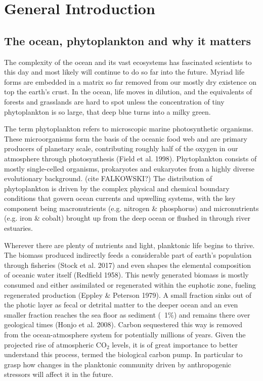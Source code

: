 \chapter{General Introduction}

\section{The ocean, phytoplankton and why it matters}
The complexity of the ocean and its vast ecosystems has fascinated scientists to this day and most likely will continue to do so far into the future. Myriad life forms are embedded in a matrix so far removed from our mostly dry existence on top the earth’s crust. In the ocean, life moves in dilution, and the equivalents of forests and grasslands are hard to spot unless the concentration of tiny phytoplankton is so large, that deep blue turns into a milky green.

The term phytoplankton refers to microscopic marine photosynthetic organisms. These microorganisms form the basis of the oceanic food web and are primary producers of planetary scale, contributing roughly half of the oxygen in our atmosphere through photosynthesis (Field et al. 1998). Phytoplankton consists of mostly single-celled organisms, prokaryotes and eukaryotes from a highly diverse evolutionary background. (cite FALKOWSKI?) 
The distribution of phytoplankton is driven by the complex physical and chemical boundary conditions that govern ocean currents and upwelling systems, with the key component being macronutrients (e.g. nitrogen \& phosphorus) and micronutrients (e.g. iron \& cobalt) brought up from the deep ocean or flushed in through river estuaries. 

Wherever there are plenty of nutrients and light, planktonic life begins to thrive. The biomass produced indirectly feeds a considerable part of earth’s population through fisheries (Stock et al. 2017) and even shapes the elemental composition of oceanic water itself (Redfield 1958). 
This newly generated biomass is mostly consumed and either assimilated or regenerated within the euphotic zone, fueling regenerated production (Eppley \& Peterson 1979). A small fraction sinks out of the photic layer as fecal or detrital matter to the deeper ocean and an even smaller fraction reaches the sea floor as sediment (~1\%) and remains there over geological times (Honjo et al. 2008). 
Carbon sequestered this way is removed from the ocean-atmosphere system for potentially millions of years. Given the projected rise of atmospheric CO$_2$ levels, it is of great importance to better understand this process, termed the biological carbon pump. In particular to grasp how changes in the planktonic community driven by anthropogenic stressors will affect it in the future.

